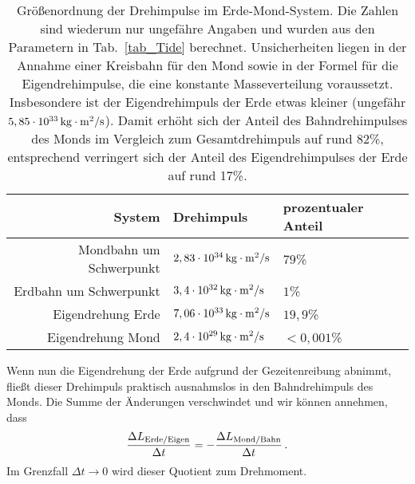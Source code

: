 \begin{table}[htb]
\begin{tabular}{r|l|l}
System & Drehimpuls & prozentualer Anteil \\ \hline
Mondbahn um Schwerpunkt & $ 2,83 \cdot 10^{34}\, {\rm kg\cdot m^2/s}$ & $79$\% \\  
Erdbahn um Schwerpunkt & $  3,4 \cdot 10^{32}\, {\rm kg\cdot m^2/s} $ & $1$\%\\ 
Eigendrehung Erde &  $ 7,06 \cdot 10^{33}\, {\rm kg\cdot m^2/s} $ & $19,9$\% \\
Eigendrehung Mond &  $ 2,4 \cdot 10^{29} \, {\rm kg\cdot m^2/s}  $ & $<0,001$\% \\
\end{tabular}
\caption{\label{tab_Drehimpuls}%
Gr\"o\ss enordnung der Drehimpulse im Erde-Mond-System. Die Zahlen sind wiederum nur
ungef\"ahre Angaben und wurden aus den Parametern in Tab.\ \ref{tab_Tide} berechnet. 
Unsicherheiten liegen in der Annahme einer Kreisbahn f\"ur den
Mond sowie in der Formel f\"ur die Eigendrehimpulse, die eine konstante Masseverteilung
voraussetzt. Insbesondere ist der Eigendrehimpuls der Erde etwas kleiner (ungef\"ahr 
$5,85\cdot 10^{33}\, {\rm kg\cdot m^2/s}$). Damit erh\"oht sich der Anteil des Bahndrehimpulses des
Monds im Vergleich zum Gesamtdrehimpuls auf rund 82\%, entsprechend verringert
sich der Anteil des Eigendrehimpulses der Erde auf rund 17\%. 
}
\end{table}

Wenn nun die Eigendrehung der Erde aufgrund der Gezeitenreibung abnimmt, flie\ss t
dieser Drehimpuls praktisch ausnahmslos in den Bahndrehimpuls des Monds. Die Summe
der \"Anderungen verschwindet und wir k\"onnen
annehmen, dass
\begin{equation}
          \frac{\Delta L_{\rm Erde/Eigen}}{\Delta t} = -  \frac{\Delta L_{\rm Mond/Bahn}}{\Delta t}  \, .
\end{equation}
Im Grenzfall $\Delta t \rightarrow 0$ wird dieser Quotient zum Drehmoment. 

